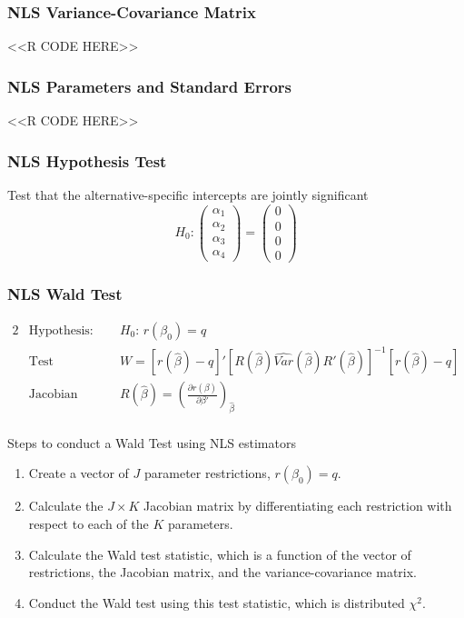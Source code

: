 \documentclass{beamer}
\begin{document}
\begin{frame}[fragile]\frametitle{NLS Variance-Covariance Matrix}
    <<R CODE HERE>>
\end{frame}

\begin{frame}[fragile]\frametitle{NLS Parameters and Standard Errors}
    <<R CODE HERE>>
\end{frame}

\begin{frame}\frametitle{NLS Hypothesis Test}
    Test that the alternative-specific intercepts are jointly significant
    $$H_0:
    \begin{pmatrix}
        \alpha_1 \\
        \alpha_2 \\
        \alpha_3 \\
        \alpha_4
    \end{pmatrix}
    =
    \begin{pmatrix}
        0 \\
        0 \\
        0 \\
        0
    \end{pmatrix}$$
\end{frame}

\begin{frame}\frametitle{NLS Wald Test}
    \begin{alignat*}{2}
        &\text{Hypothesis:} &&H_0 \text{: } r(\beta_0) = q \\
        &\text{Test statistic:} &&W = [r(\hat{\beta}) - q]' [ R(\hat{\beta}) \widehat{Var}(\hat{\beta}) R'(\hat{\beta})]^{-1} [r(\hat{\beta}) - q] \\
        &\text{Jacobian matrix:} \quad &&R(\hat{\beta}) = \left( \frac{\partial r(\beta)}{\partial \beta'} \right)_{\hat{\beta}}
    \end{alignat*} \\
    \vspace{2ex}
    Steps to conduct a Wald Test using NLS estimators
    \begin{enumerate}
        \item Create a vector of $J$ parameter restrictions, $r(\beta_0) = q$.
        \item Calculate the $J \times K$ Jacobian matrix by differentiating each restriction with respect to each of the $K$ parameters.
        \item Calculate the Wald test statistic, which is a function of the vector of restrictions, the Jacobian matrix, and the variance-covariance matrix.
        \item Conduct the Wald test using this test statistic, which is distributed $\chi^2$.
    \end{enumerate}
\end{frame}
\end{document}
